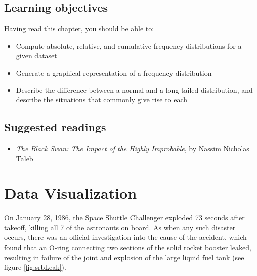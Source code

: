\documentclass[12pt,]{book}
\providecommand{\tightlist}{%
  \setlength{\itemsep}{0pt}\setlength{\parskip}{0pt}}
\theoremstyle{definition}
\theoremstyle{definition}
\theoremstyle{definition}
\theoremstyle{remark}
\begin{document}
\hypertarget{learning-objectives-2}{%
\section{Learning objectives}\label{learning-objectives-2}}

Having read this chapter, you should be able to:

\begin{itemize}
\tightlist
\item
  Compute absolute, relative, and cumulative frequency distributions for a given dataset
\item
  Generate a graphical representation of a frequency distribution
\item
  Describe the difference between a normal and a long-tailed distribution, and describe the situations that commonly give rise to each
\end{itemize}

\hypertarget{suggested-readings-2}{%
\section{Suggested readings}\label{suggested-readings-2}}

\begin{itemize}
\tightlist
\item
  \emph{The Black Swan: The Impact of the Highly Improbable}, by Nassim Nicholas Taleb
\end{itemize}

\hypertarget{data-visualization}{%
\chapter{Data Visualization}\label{data-visualization}}

On January 28, 1986, the Space Shuttle Challenger exploded 73 seconds after takeoff, killing all 7 of the astronauts on board. As when any such disaster occurs, there was an official investigation into the cause of the accident, which found that an O-ring connecting two sections of the solid rocket booster leaked, resulting in failure of the joint and explosion of the large liquid fuel tank (see figure \ref{fig:srbLeak}).
\end{document}
